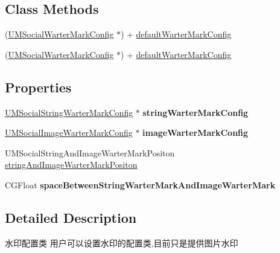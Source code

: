 \subsection*{Class Methods}
\begin{DoxyCompactItemize}
\item 
(\mbox{\hyperlink{interface_u_m_social_warter_mark_config}{U\+M\+Social\+Warter\+Mark\+Config}} $\ast$) + \mbox{\hyperlink{interface_u_m_social_warter_mark_config_a6cc7b3226f2d0de0135a109ef510c0c8}{default\+Warter\+Mark\+Config}}
\item 
(\mbox{\hyperlink{interface_u_m_social_warter_mark_config}{U\+M\+Social\+Warter\+Mark\+Config}} $\ast$) + \mbox{\hyperlink{interface_u_m_social_warter_mark_config_a6cc7b3226f2d0de0135a109ef510c0c8}{default\+Warter\+Mark\+Config}}
\end{DoxyCompactItemize}
\subsection*{Properties}
\begin{DoxyCompactItemize}
\item 
\mbox{\label{interface_u_m_social_warter_mark_config_a0311fd1c57bef7723420b7cc68b0d8b7}} 
\mbox{\hyperlink{interface_u_m_social_string_warter_mark_config}{U\+M\+Social\+String\+Warter\+Mark\+Config}} $\ast$ {\bfseries string\+Warter\+Mark\+Config}
\item 
\mbox{\label{interface_u_m_social_warter_mark_config_a8c91dacba063c226fda61810f73ca9fc}} 
\mbox{\hyperlink{interface_u_m_social_image_warter_mark_config}{U\+M\+Social\+Image\+Warter\+Mark\+Config}} $\ast$ {\bfseries image\+Warter\+Mark\+Config}
\item 
U\+M\+Social\+String\+And\+Image\+Warter\+Mark\+Positon \mbox{\hyperlink{interface_u_m_social_warter_mark_config_a4e30755580ad7774fdcf27f471e39be4}{string\+And\+Image\+Warter\+Mark\+Positon}}
\item 
\mbox{\label{interface_u_m_social_warter_mark_config_a5a68a9a06a015d79a30fc1cd276e61ad}} 
C\+G\+Float {\bfseries space\+Between\+String\+Warter\+Mark\+And\+Image\+Warter\+Mark}
\end{DoxyCompactItemize}


\subsection{Detailed Description}
水印配置类 用户可以设置水印的配置类,目前只是提供图片水印

